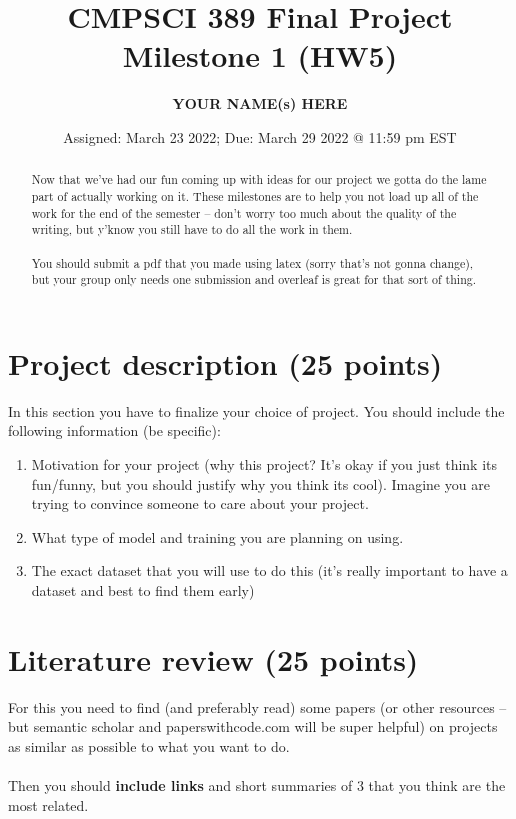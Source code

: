 \documentclass{article}
\begin{document}
\title{CMPSCI 389 Final Project Milestone 1 (HW5)}
\author{\textbf{YOUR NAME(s) HERE}}
\date{Assigned: March 23 2022; Due: March 29 2022 @ 11:59 pm EST}

\maketitle

\begin{abstract}
    Now that we've had our fun coming up with ideas for our project we gotta do the lame part of actually working on it. These milestones are to help you not load up all of the work for the end of the semester -- don't worry too much about the quality of the writing, but y'know you still have to do all the work in them. \\ \\
    You should submit a pdf that you made using latex (sorry that's not gonna change), but your group only needs one submission and overleaf is great for that sort of thing. 
    
\end{abstract}

\section{Project description (25 points)}
In this section you have to finalize your choice of project. You should include the following information (be specific):
\begin{enumerate}
    \item Motivation for your project (why this project? It's okay if you just think its fun/funny, but you should justify why you think its cool). Imagine you are trying to convince someone to care about your project.
    \item What type of model and training you are planning on using. 
    \item The exact dataset that you will use to do this (it's really important to have a dataset and best to find them early)
\end{enumerate}

\section{Literature review (25 points)}
For this you need to find (and preferably read) some papers (or other resources -- but semantic scholar and paperswithcode.com will be super helpful) on projects as similar as possible to what you want to do. \\ \\
Then you should \textbf{include links} and short summaries of 3 that you think are the most related. 
\end{document}
